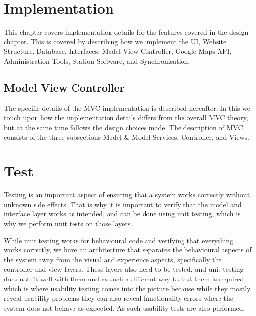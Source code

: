 	\chapter{Implementation}
	This chapter covers implementation details for the features covered in the design chapter.
	This is covered by describing how we implement the UI, Website Structure, Database, Interfaces, Model View Controller, Google Maps API, Administration Tools, Station Software, and Synchronisation.
	 
	
	
	
	
	\section{Model View Controller}
	The specific details of the MVC implementation is described hereafter. In this we touch upon how the implementation details differs from the overall MVC theory, but at the same time follows the design choices made. The description of MVC consists of the three subsections Model \& Model Services, Controller, and Views.
	
	
	
	
	
	
	
	
	\chapter{Test}
	Testing is an important aspect of ensuring that a system works correctly without unknown side effects.
	That is why it is important to verify that the model and interface layer works as intended, and can be done using unit testing, which is why we perform unit tests on those layers.
	
	While unit testing works for behavioural code and verifying that everything works correctly, we have an architecture that separates the behavioural aspects of the system away from the visual and experience aspects, specifically the controller and view layers.
	These layers also need to be tested, and unit testing does not fit well with them and as such a different way to test them is required, which is where usability testing comes into the picture because while they mostly reveal usability problems they can also reveal functionality errors where the system does not behave as expected. 
	As such usability tests are also performed.
	
	
	
